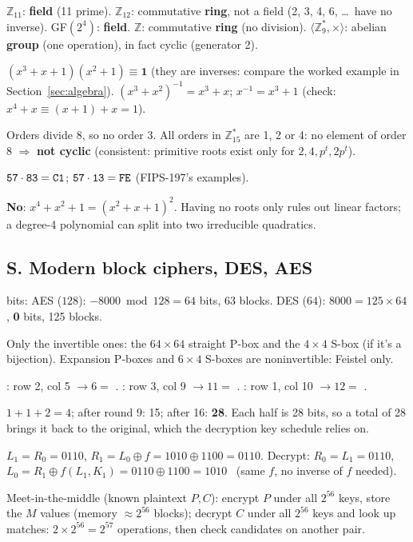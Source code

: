 \ans $\mathbb{Z}_{11}$: \textbf{field} (11 prime). $\mathbb{Z}_{12}$: commutative \textbf{ring}, not a field (2, 3, 4, 6, \dots\ have no inverse). GF$(2^4)$: \textbf{field}. $\mathbb{Z}$: commutative \textbf{ring} (no division). $\langle \mathbb{Z}_9^*, \times\rangle$: abelian \textbf{group} (one operation), in fact cyclic (generator 2).

\ans $(x^3 + x + 1)(x^2 + 1) \equiv \mathbf{1}$ (they are inverses: compare the worked example in Section~\ref{sec:algebra}). $(x^3 + x^2)^{-1} = x^3 + x$; \;$x^{-1} = x^3 + 1$ (check: $x^4 + x \equiv (x + 1) + x = 1$).

\ans Orders divide 8, so no order 3. All orders in $\mathbb{Z}_{15}^*$ are 1, 2 or 4: no element of order 8 $\Rightarrow$ \textbf{not cyclic} (consistent: primitive roots exist only for $2, 4, p^t, 2p^t$).

\ans $\texttt{57} \cdot \texttt{83} = \texttt{C1}$; \;$\texttt{57} \cdot \texttt{13} = \texttt{FE}$ (FIPS-197's examples).

\ans \textbf{No}: $x^4 + x^2 + 1 = (x^2 + x + 1)^2$. Having no roots only rules out linear factors; a degree-4 polynomial can split into two irreducible quadratics.

\subsection*{S. Modern block ciphers, DES, AES}
 bits: AES ($128$): $-8000 \bmod 128 = 64$ bits, 63 blocks. DES ($64$): $8000 = 125 \times 64$, \textbf{0} bits, 125 blocks.

\ans Only the invertible ones: the $64 \times 64$ straight P-box and the $4 \times 4$ S-box (if it's a bijection). Expansion P-boxes and $6 \times 4$ S-boxes are noninvertible: Feistel only.

\ans {}: row 2, col 5 $\to 6 =$ . : row 3, col 9 $\to 11 =$ . : row 1, col 10 $\to 12 =$ .

\ans $1 + 1 + 2 = 4$; after round 9: 15; after 16: \textbf{28}. Each half is 28 bits, so a total of 28 brings it back to the original, which the decryption key schedule relies on.

\ans $L_1 = R_0 = 0110$, $R_1 = L_0 \oplus f = 1010 \oplus 1100 = 0110$. Decrypt: $R_0 = L_1 = 0110$, $L_0 = R_1 \oplus f(L_1, K_1) = 0110 \oplus 1100 = 1010$ \checkmark\ (same $f$, no inverse of $f$ needed).

\ans Meet-in-the-middle (known plaintext $P, C$): encrypt $P$ under all $2^{56}$ keys, store the $M$ values (memory $\approx 2^{56}$ blocks); decrypt $C$ under all $2^{56}$ keys and look up matches: $2 \times 2^{56} = 2^{57}$ operations, then check candidates on another pair.

